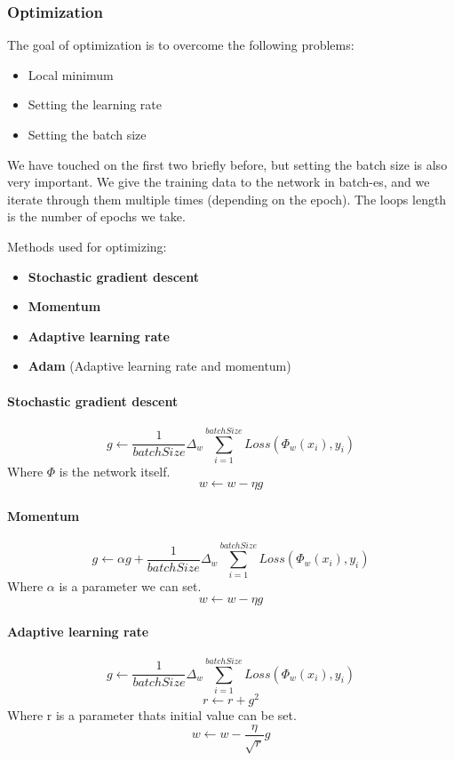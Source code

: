 \subsubsection{Optimization}
The goal of optimization is to overcome the following problems:
\begin{itemize}
	\item Local minimum
	\item Setting the learning rate
	\item Setting the batch size
\end{itemize}

We have touched on the first two briefly before, but setting the batch size is also very important. We give the training data to the network in batch-es, and we iterate through them multiple times (depending on the epoch). The loops length is the number of epochs we take.

Methods used for optimizing:
\begin{itemize}
	\item \textbf{Stochastic gradient descent}
	\item \textbf{Momentum}
	\item \textbf{Adaptive learning rate}
	\item \textbf{Adam} (Adaptive learning rate and momentum)
\end{itemize}

\paragraph*{Stochastic gradient descent}
\[g \leftarrow \frac{1}{batchSize}\Delta_w \sum_{i=1}^{batchSize}Loss(\Phi_w(x_i), y_i)\]
Where \(\Phi\) is the network itself.
\[w \leftarrow w - \eta g\]

\paragraph*{Momentum}
\[g \leftarrow \alpha g + \frac{1}{batchSize}\Delta_w \sum_{i=1}^{batchSize}Loss(\Phi_w(x_i), y_i)\]
Where \(\alpha\) is a parameter we can set.
\[w \leftarrow w - \eta g\]

\paragraph*{Adaptive learning rate}
\[g \leftarrow \frac{1}{batchSize}\Delta_w \sum_{i=1}^{batchSize}Loss(\Phi_w(x_i), y_i)\]
\[r \leftarrow r + g^2\]
Where r is a parameter thats initial value can be set.
\[w \leftarrow w - \frac{\eta}{\sqrt{r}} g\]

